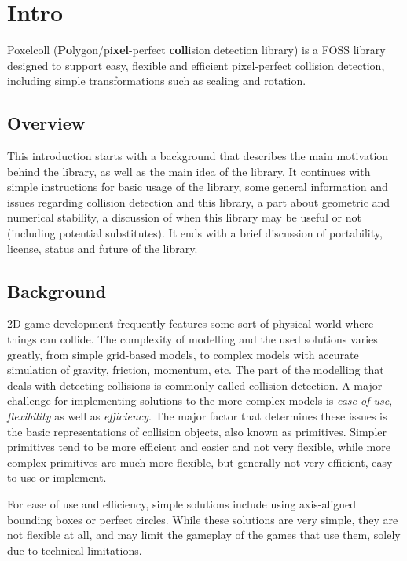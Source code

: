 
\section{Intro}

Poxelcoll (\textbf{Po}lygon/pi\textbf{xel}-perfect \textbf{coll}ision detection library)
is a FOSS library designed to support easy, flexible and efficient pixel-perfect collision detection,
including simple transformations such as scaling and rotation.

\subsection{Overview}

This introduction starts with a background that describes the main motivation behind
the library, as well as the main idea of the library. It continues with
simple instructions for basic usage of the library, some general information
and issues regarding collision detection and this library, a part about
geometric and numerical stability, a discussion
of when this library may be useful or not (including potential substitutes).
It ends with a brief discussion of portability, license, status and future
of the library.

\subsection{Background}

2D game development frequently features some sort of physical world where
things can collide. The complexity of modelling and the used solutions
varies greatly, from simple grid-based models, to complex models
with accurate simulation of gravity, friction, momentum, etc.
The part of the modelling that deals with detecting collisions is commonly called
collision detection.
A major challenge for implementing solutions to the more complex models
is \emph{ease of use}, \emph{flexibility} as well as \emph{efficiency}.
The major factor that determines these issues is the basic representations
of collision objects, also known as primitives.
Simpler primitives tend to be more efficient
and easier and not very flexible, while more complex primitives are
much more flexible, but generally not very efficient, easy to use or implement.

For ease of use and efficiency, simple solutions include using
axis-aligned bounding boxes or perfect circles. While these solutions
are very simple, they are not flexible at all, and may limit the gameplay
of the games that use them, solely due to technical limitations.

